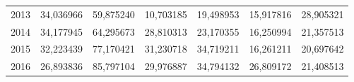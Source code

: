 \begin{table}
\begin{tabular}{p{1cm}p{2cm}p{2cm}p{2cm}p{2cm}p{2cm}p{2cm}}
 2013 & 34,036966 &                           59,875240 &         10,703185 &                         19,498953 & 15,917816 &  28,905321 \\
 2014 & 34,177945 &                           64,295673 &         28,810313 &                         23,170355 & 16,250994 &  21,357513 \\
 2015 & 32,223439 &                           77,170421 &         31,230718 &                         34,719211 & 16,261211 &  20,697642 \\
 2016 & 26,893836 &                           85,797104 &         29,976887 &                         34,794132 & 26,809172 &  21,408513 \\
\bottomrule
\end{tabular}
\end{table}
